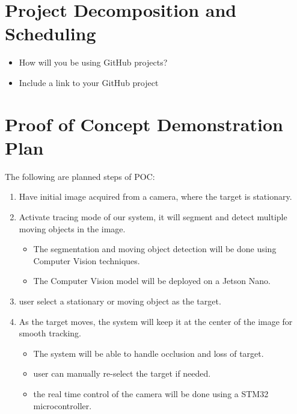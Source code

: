 \documentclass{article}
\begin{document}
\section{Project Decomposition and Scheduling}

\begin{itemize}
  \item How will you be using GitHub projects?
  \item Include a link to your GitHub project
\end{itemize}


\section{Proof of Concept Demonstration Plan}

The following are planned steps of POC:

\begin{enumerate}
  \item Have initial image acquired from a camera, where the target is stationary.
  \item Activate tracing mode of our system, it will segment and detect multiple moving objects in the image.
    \begin{itemize}
      \item The segmentation and moving object detection will be done using Computer Vision techniques.
      \item The Computer Vision model will be deployed on a Jetson Nano.
    \end{itemize}
  \item user select a stationary or moving object as the target.
  \item As the target moves, the system will keep it at the center of the image for smooth tracking.
    \begin{itemize}
      \item The system will be able to handle occlusion and loss of target.
      \item user can manually re-select the target if needed.
      \item the real time control of the camera will be done using a STM32 microcontroller.
    \end{itemize}
\end{enumerate}
\end{document}
